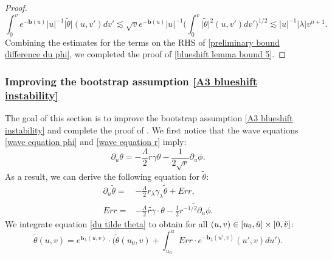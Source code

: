 \documentclass[11pt]{article}
\numberwithin{equation}{section}
\begin{document}
\begin{proof}
    \[\int_0^ve^{-\mathbf{b}(u)}|u|^{-1}\big|\widetilde{\theta}\big|(u,v')dv'\lesssim\sqrt{v}e^{-\mathbf{b}(u)}|u|^{-1}\bigg(\int_0^v\big|\widetilde{\theta}\big|^2(u,v')dv'\bigg)^{1/2}\lesssim|u|^{-1}|\lambda|v^{n+1}.\]
    Combining the estimates for the terms on the RHS of \eqref{preliminary bound difference du phi}, we completed the proof of \eqref{blueshift lemma bound 5}.
\end{proof}

\subsubsection{Improving the bootstrap assumption \eqref{A3 blueshift instability}}\label{A3 section}
The goal of this section is to improve the bootstrap assumption \eqref{A3 blueshift instability} and complete the proof of . We first notice that the wave equations \eqref{wave equation phi} and \eqref{wave equation r} imply:
\[\partial_u\theta=-\frac{\Lambda}{2}r\gamma\theta-\frac{1}{2\sqrt{r}}\partial_u\phi.\]
As a result, we can derive the following equation for $\widetilde{\theta}:$
\begin{align}
    \partial_u\widetilde{\theta}=&-\frac{\Lambda}{2}r_{\lambda}\gamma_{\lambda}\widetilde{\theta}+Err,\label{du tilde theta}\\
    Err=&-\frac{\Lambda}{2}\widetilde{r\gamma}\cdot\theta-\frac{1}{2}\widetilde{r^{-1/2}\partial_u\phi}. \label{def of err instability}
\end{align}
We integrate equation \eqref{du tilde theta} to obtain for all $(u,v)\in[u_0,\Tilde{u}]\times[0,\Tilde{v}]$:
\begin{equation}\label{tilde theta integrated}
    \widetilde{\theta}(u,v)=e^{\mathbf{b}_{\lambda}(u,v)}\cdot\bigg(\widetilde{\theta}(u_0,v)+\int_{u_0}^uErr\cdot e^{-\mathbf{b}_{\lambda}(u',v)}(u',v)du'\bigg).
\end{equation}
\end{document}
